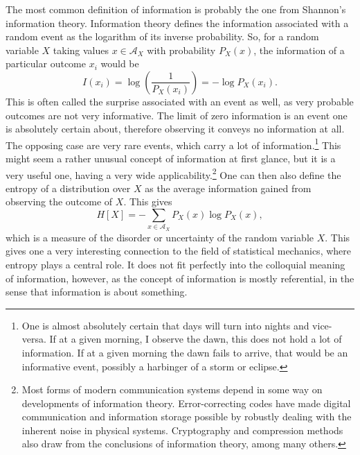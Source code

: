 The most common definition of information is probably the one from Shannon's information theory.
Information theory defines the information associated with a random event as the logarithm of its inverse
probability. So, for a random variable $X$ taking values $x \in \mathcal{A}_X$ with probability $P_X(x)$, the information of a particular outcome $x_i$ would be
\[
I(x_i) = \log\left(\frac{1}{P_X(x_i)}\right) = -\log P_X(x_i).
\]
This is often called the surprise associated with an event as well, as very probable outcomes are not very informative. The limit of zero information is an event one is
absolutely certain about, therefore observing it conveys no information at all. The opposing case are very rare events, which carry a lot of information.\footnote{One is 
almost absolutely certain that days will turn into nights and vice-versa. If
at a given morning, I observe the dawn, this does not hold a lot of information. If at a given morning the dawn fails to arrive, that would be an informative event, possibly
a harbinger of a storm or eclipse.}
This might seem a rather unusual concept of information at first glance,
but it is a very useful one, having a very wide applicability.\footnote{Most forms of modern communication systems depend in some way on developments of information
theory. Error-correcting codes have made digital communication and information storage possible by robustly dealing with the inherent noise in physical systems. 
Cryptography and compression methods also draw from the conclusions of information theory, among many others.}
One can then also define the entropy of a distribution over $X$ as the average information gained from
observing the outcome of $X$. This gives
\[
H[X] = -\sum_{x\in \mathcal{A}_X} P_X(x) \log P_X(x),
\]
which is a measure of the disorder or uncertainty of the random variable $X$.
This gives one a very interesting connection to the field of statistical mechanics, where entropy plays a central role. It does not fit perfectly into the colloquial meaning of 
information, however, as the concept of information is mostly referential, in the sense that information is about something.\par

